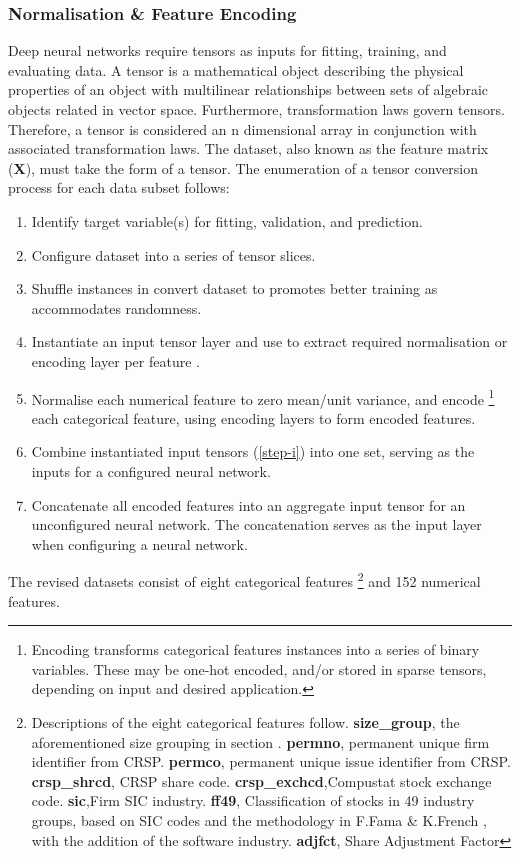 \documentclass[12pt]{article}
\begin{document}
\subsubsection{Normalisation \& Feature Encoding}
Deep neural networks require tensors as inputs for fitting, training, and evaluating data.
A tensor is a mathematical object describing the physical properties of an object with multilinear relationships between sets of algebraic objects related in vector space.
Furthermore, transformation laws govern tensors. 
Therefore, a tensor is considered an n dimensional array in conjunction with associated transformation laws.
The dataset, also known as the feature matrix (\textbf{X}), must take the form of a tensor.
The enumeration of a tensor conversion process for each data subset follows:
\singlespacing
\begin{enumerate} 
\item Identify target variable(s) for fitting, validation, and prediction.
\item Configure dataset into a series of tensor slices.
\item Shuffle instances in convert dataset to promotes better training as accommodates randomness.
\item Instantiate an input tensor layer and use to extract required normalisation or encoding layer per feature \label{step-i}.
\item Normalise each numerical feature to zero mean/unit variance, and encode 
\footnote{Encoding transforms categorical features instances into a series of binary variables.
These may be one-hot encoded, and/or stored in sparse tensors, depending on input and desired application.} 
each categorical feature, using encoding layers to form encoded features.
\item Combine instantiated input tensors (\ref{step-i}) into one set, serving as the inputs for a configured neural network.
\item Concatenate all encoded features into an aggregate input tensor for an unconfigured neural network. 
The concatenation serves as the input layer when configuring a neural network.
\end{enumerate}
\doublespacing
The revised datasets consist of eight categorical features
\footnote{Descriptions of the eight categorical features follow. 
\textbf{size\_group}, the aforementioned size grouping in section \label{data-processing}. 
\textbf{permno}, permanent unique firm identifier from CRSP.
\textbf{permco}, permanent unique issue identifier from CRSP.
\textbf{crsp\_shrcd}, CRSP share code.
\textbf{crsp\_exchcd},Compustat stock exchange code.
\textbf{sic},Firm SIC industry.
\textbf{ff49}, Classification of stocks in 49 industry groups, based on SIC codes and the methodology in F.Fama \& K.French \citeyear{fama1997industry}, with the addition of the software industry.
\textbf{adjfct}, Share Adjustment Factor}
and 152 numerical features.
\end{document}
